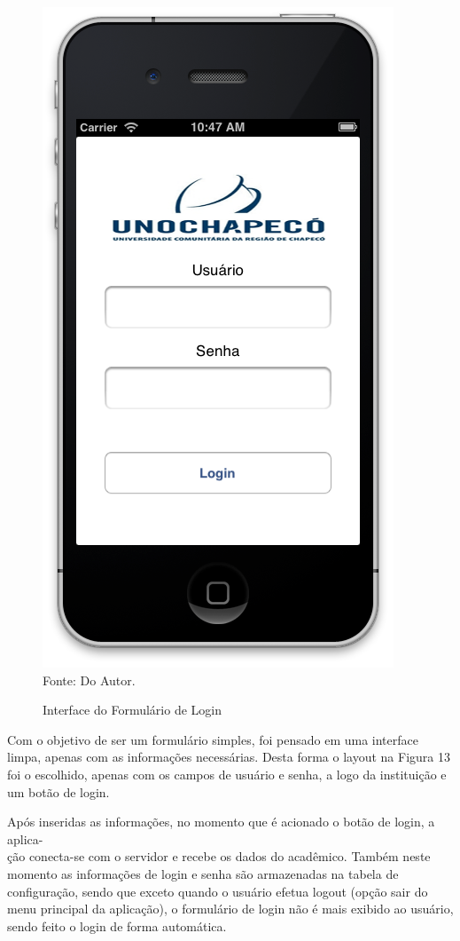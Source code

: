 \begin{figure}[!htb]
     \centering
     \caption[Formulário de Login - Interface]{Interface do Formulário de Login}
     \includegraphics[scale=0.34]{imagens/formlogin.png}
     \\  Fonte: Do Autor.
\end{figure}

Com o objetivo de ser um formulário simples, foi pensado em uma interface limpa, apenas com as informações necessárias. Desta forma o layout na Figura 13 foi o escolhido, apenas com os campos de usuário e senha, a logo da instituição e um botão de login.

Após inseridas as informações, no momento que é acionado o botão de login, a aplica- \\ção conecta-se com o servidor e recebe os dados do acadêmico. Também neste momento as informações de login e senha são armazenadas na tabela de configuração, sendo que exceto quando o usuário efetua logout (opção sair do menu principal da aplicação), o formulário de login não é mais exibido ao usuário, sendo feito o login de forma automática.

